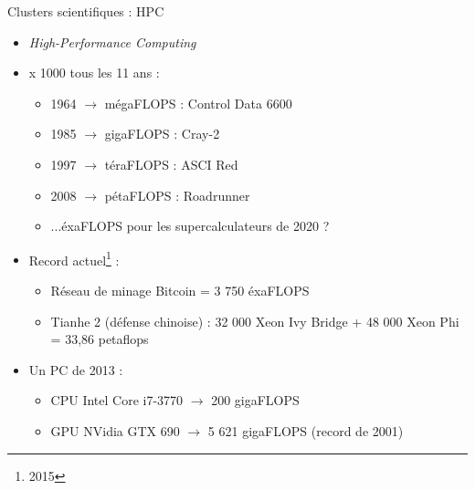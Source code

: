 \begin{frame}{Clusters scientifiques : HPC}
\begin{itemize}
\item \textit{High-Performance Computing}
\item <2->x 1000 tous les 11 ans :
\begin{itemize}
\item 1964 $\rightarrow$ mégaFLOPS : Control Data 6600
\item 1985 $\rightarrow$ gigaFLOPS : Cray-2
\item 1997 $\rightarrow$ téraFLOPS : ASCI Red
\item 2008 $\rightarrow$ pétaFLOPS : Roadrunner
\item ...éxaFLOPS pour les supercalculateurs de 2020 ?
\end{itemize}
\item <3->Record actuel\footnote{2015} :
\begin{itemize}
\item Réseau de minage Bitcoin = 3 750 éxaFLOPS
\item Tianhe 2 (défense chinoise) : 32 000 Xeon Ivy Bridge + 48 000 Xeon Phi = 33,86 petaflops
\end{itemize}

\item <4->Un PC de 2013 :
\begin{itemize}
\item CPU Intel Core i7-3770 $\rightarrow$ 200 gigaFLOPS
\item GPU NVidia GTX 690 $\rightarrow$ 5 621 gigaFLOPS (record de 2001)
\end{itemize}
\end{itemize}
\end{frame}

